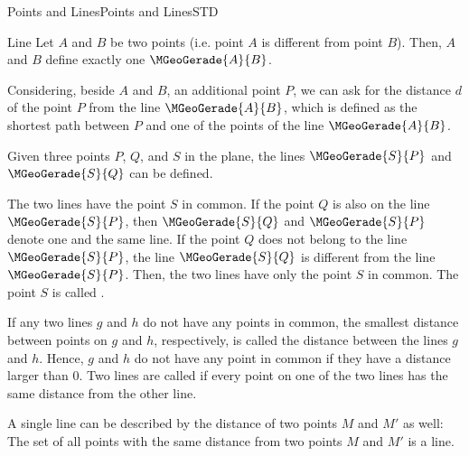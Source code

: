 \begin{MXContent}{Points and Lines}{Points and Lines}{STD}
\begin{MXInfo}{Line}
Let $A$ and $B$ be two points (i.e. point $A$ is different from point $B$). Then, $A$ and $B$ define
exactly one  $\MGeoGerade{A}{B}$.
\end{MXInfo}

Considering, beside $A$ and $B$, an additional point $P$, we can ask for the distance $d$ of the point 
$P$ from the line $\MGeoGerade{A}{B}$, which is defined as the shortest path between $P$ and one of 
the points of the line $\MGeoGerade{A}{B}$.

\begin{center}
\end{center}

Given three points $P$, $Q$, and $S$ in the plane, the lines $\MGeoGerade{S}{P}$ and 
$\MGeoGerade{S}{Q}$ can be defined.

The two lines have the point $S$ in common. If the point $Q$ is also on the line $\MGeoGerade{S}{P}$,
then $\MGeoGerade{S}{Q}$ and $\MGeoGerade{S}{P}$ denote one and the same line. If the 
point $Q$ does not belong to the line $\MGeoGerade{S}{P}$, the line $\MGeoGerade{S}{Q}$ is
different from the line $\MGeoGerade{S}{P}$. Then, the two lines have only the point $S$ in common.
The point $S$ is called . 

If any two lines $g$ and $h$ do not have any points in common, the smallest 
distance between points on $g$ and $h$, respectively, is called the distance between 
the lines $g$ and $h$. Hence, $g$ and $h$ do not have any point in common if they have 
a distance larger than $0$. Two lines are called  if every point 
on one of the two lines has the same distance from the other line.

A single line can be described by the distance of two points $M$ and $M'$ as well: The set 
of all points with the same distance from two points $M$ and $M'$ is a line.


\end{MXContent}

